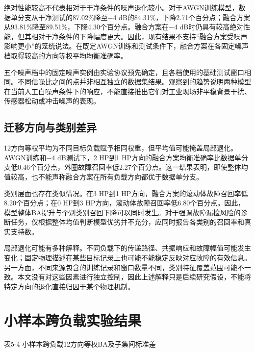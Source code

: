 \documentclass[UTF8,12pt,openany,twoside]{ctexbook}
\numberwithin{equation}{chapter}
\begin{document}
绝对性能较高不代表相对于干净条件的噪声退化较小。对于AWGN训练模型，数据单分支从干净测试的87.02\%降至−4 dB的84.31\%，下降2.71个百分点；融合方案从93.81\%降至89.51\%，下降4.30个百分点。融合方案在−4 dB时仍具有较高绝对性能，但其相对干净条件的下降幅度更大。因此，现有结果不支持``融合方案受噪声影响更小''的笼统说法。在既定AWGN训练和测试条件下，融合方案在各固定噪声档取得较高的方向等权平均均衡准确率。

五个噪声档中的固定噪声实例由实验协议预先确定，且各档使用的基础测试窗口相同。不同信噪比之间的点并非相互独立的数据集结果。观察到的趋势说明两种模型在当前人工白噪声条件下的响应，不能直接推出它们对工业现场非平稳背景干扰、传感器松动或冲击噪声的表现。

\subsection{迁移方向与类别差异}\label{ux8fc1ux79fbux65b9ux5411ux4e0eux7c7bux522bux5deeux5f02}

12方向等权平均为不同目标负载赋予相同权重，但平均值可能掩盖局部退化。AWGN训练和−4 dB测试下，2 HP到1 HP方向的融合方案均衡准确率比数据单分支低0.46个百分点，外圈故障召回率低2.27个百分点。这一结果表明，即使整体均值较高，也不能声称融合方案在所有负载方向都优于数据单分支。

类别层面也存在类似情况。在3 HP到1 HP方向，融合方案的滚动体故障召回率低8.20个百分点；在0 HP到3 HP方向，滚动体故障召回率低6.80个百分点。因此，模型整体BA提升与个别类别召回下降可以同时发生。对于强调故障漏检风险的诊断任务，仅根据整体均值判断模型优劣并不充分，应同时报告各类别的召回率和真实支持数。

局部退化可能有多种解释。不同负载下的传递路径、共振响应和故障幅值可能发生变化；固定物理描述在某些目标记录上也可能不能稳定反映对应故障的有效信息。另一方面，不同来源包含的训练记录和窗口数量不同，类别特征覆盖范围可能不一致。本文没有对这些因素进行独立控制，因此上述解释只是后续研究假设，不能将特定方向的退化直接归因于某个物理机制。

\section{小样本跨负载实验结果}\label{ux5c0fux6837ux672cux8de8ux8d1fux8f7dux5b9eux9a8cux7ed3ux679c}

\begin{center}表5-4 小样本跨负载12方向等权BA及子集间标准差\end{center}
\end{document}
